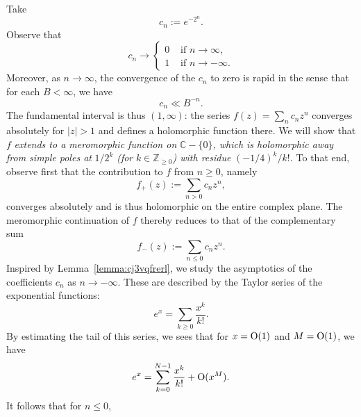 \documentclass[reqno]{amsart}  \numberwithin{theorem}{section} \numberwithin{equation}{section}
\begin{document}
\begin{example}\label{example:cj4ungymno}
  Take
  \begin{equation*}
    c_n:= e^{- 2^n }.
  \end{equation*}
  Observe that
  \begin{equation*}
    c_n \rightarrow
    \begin{cases}
      0 &  \text{ if } n \rightarrow \infty, \\
      1 & \text{ if } n \rightarrow - \infty.
    \end{cases}
  \end{equation*}
  Moreover, as $n \rightarrow \infty$, the convergence of the $c_n$ to zero is rapid in the sense that for each $B < \infty$, we have
  \begin{equation*}
    c_n \ll B^{-n}.
  \end{equation*}
  The fundamental interval is thus $(1,\infty)$: the series $f(z) = \sum_{n} c_n z^n$ converges absolutely for $|z| > 1$ and defines a holomorphic function there.  We will show that $f$ \emph{extends to a meromorphic function on} $\mathbb{C} - \{0\}$\emph{, which is holomorphic away from simple poles at} $1 / 2^k$ \emph{(for} $k \in \mathbb{Z}_{\geq 0}$\emph{) with residue} $(-1/4)^k / k!$\emph{.}  To that end, observe first that the contribution to $f$ from $n \geq 0$, namely
  \begin{equation*}
    f_+(z) := \sum_{n > 0} c_n z^n,
  \end{equation*}
  converges absolutely and is thus holomorphic on the entire complex plane.  The meromorphic continuation of $f$ thereby reduces to that of the complementary sum
  \begin{equation*}
    f_-(z) := \sum_{n \leq  0} c_n z^n.
  \end{equation*}
  Inspired by Lemma~\ref{lemma:cj3vqfrerl}, we study the asymptotics of the coefficients $c_n$ as $n \rightarrow - \infty$.  These are described by the Taylor series of the exponential functions:
  \begin{equation*}
    e^{x} = \sum_{k \geq 0} \frac{x^k }{k!}.
  \end{equation*}
  By estimating the tail of this series, we sees that for $x = \operatorname{O}(1)$ and $M = \operatorname{O}(1)$, we have
  \begin{equation*}
    e^x = \sum_{k = 0}^{N-1} \frac{x^k}{k!} + \operatorname{O} (x^M).
  \end{equation*}
  It follows that for $n \leq 0$,
  \begin{equation}\label{eq:cj3wnu8lqf}

\end{equation}
\end{example}
\end{document}
